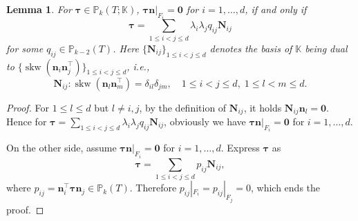 \documentclass[10pt]{amsart}
\newtheorem{lemma}[theorem]{Lemma}
\newcommand{\skw}{\operatorname{skw}}
\numberwithin{equation}{section}
\begin{document}
\begin{lemma}\label{lem:PkKbubblecharac}
For $\boldsymbol{\tau}\in\mathbb P_k(T;\mathbb K)$, $\boldsymbol{\tau}\boldsymbol{n}|_{F_i}=\boldsymbol{0}$ for $i=1,\ldots, d$, if and only if 
\begin{equation}\label{eq:PkKbubblecharac}
\boldsymbol{\tau}=\sum_{1\leq i<j\leq d}\lambda_i\lambda_jq_{ij}\boldsymbol{N}_{ij}
\end{equation}
for some $q_{ij}\in\mathbb P_{k-2}(T)$. Here $\{\boldsymbol{N}_{ij}\}_{1\leq i<j\leq d}$ denotes the basis of $\mathbb K$ being dual to $\{\skw({\boldsymbol n_i\boldsymbol n_j^{\intercal}})\}_{1\leq i<j\leq d}$, i.e.,
\[
\boldsymbol{N}_{ij}:\skw({\boldsymbol n_l\boldsymbol n_m^{\intercal}})=\delta_{il}\delta_{jm},\quad 1\leq i<j\leq d,\; 1\leq l<m\leq d.
\]
\end{lemma}
\begin{proof}
For $1\leq l\leq d$ but $l\neq i, j$, by the definition of $\boldsymbol{N}_{ij}$, it holds $\boldsymbol{N}_{ij}\boldsymbol{n}_l=\boldsymbol{0}$. Hence for $
\boldsymbol{\tau}=\sum\limits_{1\leq i<j\leq d}\lambda_i\lambda_jq_{ij}\boldsymbol{N}_{ij}
$, obviously we have $\boldsymbol{\tau}\boldsymbol{n}|_{F_i}=\boldsymbol{0}$ for $i=1,\ldots, d$.

On the other side, assume $\boldsymbol{\tau}\boldsymbol{n}|_{F_i}=\boldsymbol{0}$ for $i=1,\ldots, d$. Express $\boldsymbol{\tau}$ as 
\[
\boldsymbol{\tau}=\sum_{1\leq i<j\leq d}p_{ij}\boldsymbol{N}_{ij},
\]
where $p_{ij}=\boldsymbol{n}_i^{\intercal}\boldsymbol{\tau}\boldsymbol{n}_j\in\mathbb P_{k}(T)$.
Therefore $p_{ij}|_{F_i}=p_{ij}|_{F_j}=0$, which ends the proof.
\end{proof}
\end{document}
